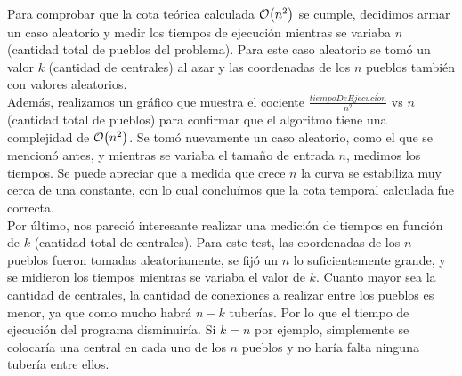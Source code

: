 \documentclass[11pt, a4paper, twoside]{article}
\begin{document}
{}

Para comprobar que la cota teórica calculada $\mathop{}\mathopen{}\mathcal{O}\mathopen{}\left(n^2\right)$ se cumple, decidimos armar un caso aleatorio y 
medir los tiempos de ejecución mientras se variaba $n$ (cantidad total de pueblos del problema). 
Para este caso aleatorio se tomó un valor $k$ (cantidad de centrales) al azar y las coordenadas de los  $n$ 
pueblos también con valores aleatorios. \\
Además, realizamos un gráfico que muestra el cociente $\frac{tiempoDeEjecuci\acute{o}n}{n^2}$ vs $n$ (cantidad
total de pueblos) para confirmar que el algoritmo tiene una complejidad de $\mathop{}\mathopen{}\mathcal{O}\mathopen{}\left(n^2\right)$. 
Se tomó nuevamente un caso aleatorio, como el que se mencionó antes, y mientras se variaba el tamaño de entrada $n$, 
medimos los tiempos. Se puede apreciar que a medida que crece $n$ la curva se estabiliza muy cerca de una constante, 
con lo cual concluímos que la cota temporal calculada fue correcta. \\


Por último, nos pareció interesante realizar una medición de tiempos en función de $k$ (cantidad total de centrales). 
Para este test, las coordenadas de los $n$ pueblos fueron tomadas aleatoriamente, se fijó un $n$ lo 
suficientemente grande, y se midieron los tiempos mientras se variaba el valor de $k$. 
Cuanto mayor sea la cantidad de centrales, la cantidad de conexiones a realizar entre los pueblos es menor, ya que 
como mucho habrá $n - k$ tuberías. Por lo que el tiempo de ejecución del programa disminuiría. 
Si $k = n$ por ejemplo, simplemente se colocaría una central en cada uno de los $n$ pueblos y no haría falta 
ninguna tubería entre ellos.\\  
 

   
\end{document}
